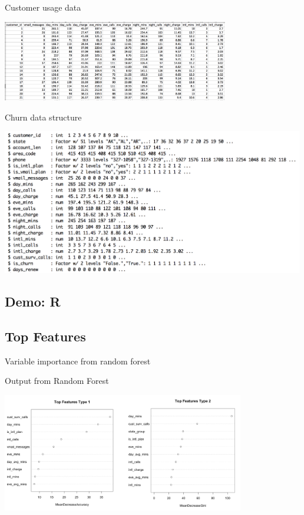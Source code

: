 \documentclass[10pt]{beamer}
\begin{document}
    \begin{frame}{Customer usage data}
        \begin{center}
          \includegraphics[height=100pt]{graphs/dataset_customer_usage}
        \end{center}
    \end{frame}

    \begin{frame}{Churn data structure}
      \begin{center}
        \includegraphics[height=180pt]{graphs/dataset_churn_str}
      \end{center}
    \end{frame}

  \subsection{Demo: R}

  \subsection{Top Features}
  
    \begin{frame}{Variable importance from random forest}
      \begin{block}{Output from Random Forest}
        \begin{center}
          \includegraphics[width=300pt]{graphs/rf_var_importance_2}
        \end{center}
      \end{block}
    \end{frame}
\end{document}
